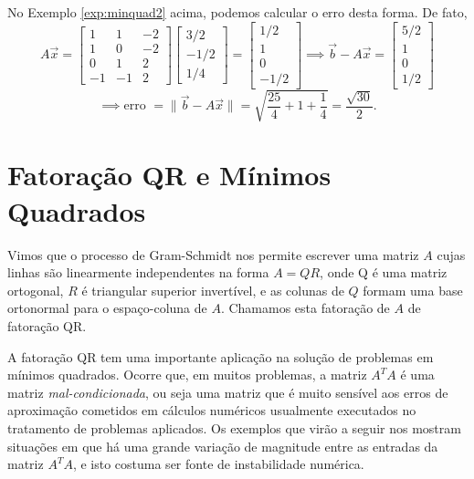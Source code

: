 \documentclass[../livro.tex]{subfiles}  %
\begin{document}
No Exemplo \ref{exp:minquad2} acima, podemos calcular o erro desta forma. De fato,
\[
A \vec{x} = 
\begin{bmatrix}
  1 & 1 & -2 \\ 
  1 & 0 & -2 \\ 
  0 & 1 &  2 \\ 
  -1 & -1&  2
\end{bmatrix}
\begin{bmatrix}
  3/2 \\ -1/2 \\ 1/4
\end{bmatrix} = 
\begin{bmatrix}
  1/2 \\ 1 \\ 0 \\ -1/2
\end{bmatrix} \implies 
\vec{b} - A\vec{x} = 
\begin{bmatrix}
  5/2 \\ 1 \\ 0 \\ 1/2
\end{bmatrix}
\]
\[
\implies \text{erro } = \| \vec{b} - A \vec{x} \| = \sqrt{\frac{25}{4} + 1 + \frac{1}{4}} = \frac{\sqrt{30}}{2}.
\]



\section{Fatoração QR e Mínimos Quadrados}

Vimos que o processo de Gram-Schmidt nos permite escrever uma matriz $A$ cujas linhas são linearmente independentes na forma $A=QR$, onde Q é uma matriz ortogonal, $R$ é triangular superior invertível, e as colunas de $Q$ formam uma base ortonormal para o espaço-coluna de $A$. Chamamos esta fatoração de $A$ de fatoração QR. 

A fatoração QR tem uma importante aplicação na solução de problemas em mínimos quadrados. Ocorre que, em muitos problemas, a matriz $A^T A$ é uma matriz {\it mal-condicionada}, ou seja uma matriz que é muito sensível aos erros de aproximação cometidos em cálculos numéricos usualmente executados no tratamento de problemas aplicados. 
Os exemplos que virão a seguir nos mostram situações em que há uma grande variação de magnitude entre as entradas da matriz $A^T A$, e isto costuma ser fonte de instabilidade numérica.
\end{document}
